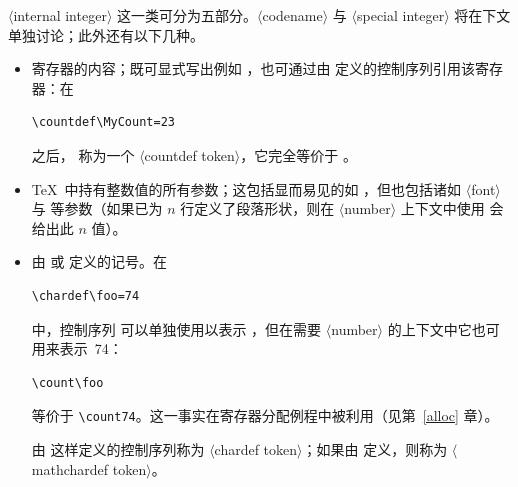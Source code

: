 \documentclass[a4paper]{rapport3}
\def\gr#1{$\langle$#1$\rangle$}\def\key#1{{\tt#1}}
\begin{document}
\gr{internal integer} 这一类可分为五部分。\gr{codename} 与 \gr{special integer} 将在下文单独讨论；此外还有以下几种。

\begin{itemize} \item {} 寄存器的内容；既可显式写出例如 ，也可通过由  定义的控制序列引用该寄存器：在
\begin{verbatim}
\countdef\MyCount=23
\end{verbatim}
之后， 称为一个 \gr{countdef token}，它完全等价于 。

\item \TeX\ 中持有整数值的所有参数；这包括显而易见的如 ，但也包括诸如 \gr{font} 与  等参数（如果已为 $n$ 行定义了段落形状，则在 \gr{number} 上下文中使用  会给出此 $n$ 值）。

\item\label{num:chardef} 由  或  定义的记号。在
\begin{verbatim}
\chardef\foo=74
\end{verbatim}
中，控制序列  可以单独使用以表示 ，但在需要 \gr{number} 的上下文中它也可用来表示~74：
\begin{verbatim}
\count\foo
\end{verbatim}
等价于 \verb=\count74=。这一事实在寄存器分配例程中被利用（见第~\ref{alloc} 章）。

由  这样定义的控制序列称为 \gr{chardef token}；如果由  定义，则称为 \gr{mathchardef token}。

\end{itemize}
\end{document}

